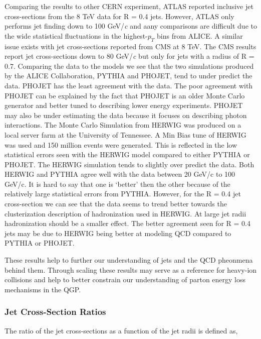 Comparing the results to other CERN experiment,  ATLAS reported inclusive jet cross-sections from the 8 TeV data for R = 0.4 jets\cite{Aaboud:2017dvo}.  However, ATLAS only performs jet finding down to 100 GeV/\textit{c} and aany comparisons are difficult due to the wide statistical fluctuations in the highest-$p_{T}$ bins from ALICE.  A similar issue exists with jet cross-sections reported from CMS at 8 TeV\cite{CMS:2013kda}.  The CMS results report jet cross-sections down to 80 GeV/\textit{c} but only for jets with a radius of R = 0.7.  Comparing the data to the models we see that the two simulations produced by the ALICE Collaboration, PYTHIA and PHOJET, tend to under predict the data.  PHOJET has the least agreement with the data.  The poor agreement with PHOJET can be explained by the fact that PHOJET is an older Monte Carlo generator and better tuned to describing lower energy experiments.  PHOJET may also be under estimating the data because it focuses on describing photon interactions.  The Monte Carlo Simulation from HERWIG was produced on a local server farm at the University of Tennessee.  A Min Bias tune of HERWIG was used and 150 million events were generated.  This is reflected in the low statistical errors seen with the HERWIG model compared to either PYTHIA or PHOJET.  The HERWIG simulation tends to slightly over predict the data.  Both HERWIG and PYTHIA agree well with the data between 20 GeV/c to 100 GeV/c.  It is hard to say that one is `better' then the other because of the relatively large statistical errors from PYTHIA.  However, for the R = 0.4 jet cross-section we can see that the data seems to trend better towards the clusterization description of hadronization used in HERWIG.  At large jet radii hadronization should be a smaller effect.  The better agreement seen for R = 0.4 jets may be due to HERWIG being better at modeling QCD compared to PYTHIA or PHOJET.

These results help to further our understanding of jets and the QCD pheonmena behind them.  Through scaling these results may serve as a reference for heavy-ion collisions and help to better constrain our understanding of parton energy loss mechanisms in the QGP.  


\subsubsection{Jet Cross-Section Ratios}


\noindent
The ratio of the jet cross-sections as a function of the jet radii is defined as,

